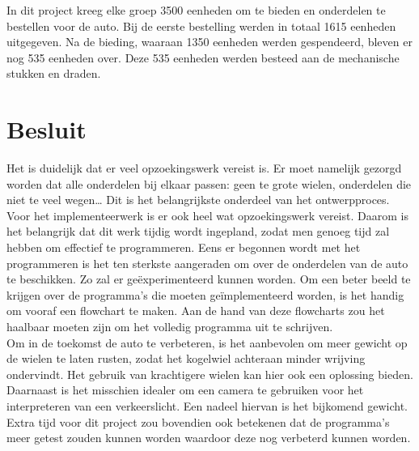\documentclass[a4paper,twoside,kulak]{kulakreport} %
\begin{document}
In dit project kreeg elke groep 3500 eenheden om te bieden en onderdelen te bestellen voor de auto. Bij de eerste bestelling werden in totaal 1615 eenheden uitgegeven. Na de bieding, waaraan 1350 eenheden werden gespendeerd, bleven er nog 535 eenheden over. Deze 535 eenheden werden besteed aan de mechanische stukken en draden. 



\section{Besluit}
Het is duidelijk dat er veel opzoekingswerk vereist is. Er moet namelijk gezorgd worden dat alle onderdelen bij elkaar passen: geen te grote wielen, onderdelen die niet te veel wegen… Dit is het belangrijkste onderdeel van het ontwerpproces.\\
Voor het implementeerwerk is er ook heel wat opzoekingswerk vereist. Daarom is het belangrijk dat dit werk tijdig wordt ingepland, zodat men genoeg tijd zal hebben om effectief te programmeren. Eens er begonnen wordt met het programmeren is het ten sterkste aangeraden om over de onderdelen van de auto te beschikken. Zo zal er geëxperimenteerd kunnen worden. Om een beter beeld te krijgen over de programma’s die moeten geïmplementeerd worden, is het handig om vooraf een flowchart te maken. Aan de hand van deze flowcharts zou het haalbaar moeten zijn om het volledig programma uit te schrijven.\\
Om in de toekomst de auto te verbeteren, is het aanbevolen om meer gewicht op de wielen te laten rusten, zodat het kogelwiel achteraan minder wrijving ondervindt. Het gebruik van krachtigere wielen kan hier ook een oplossing bieden. Daarnaast is het misschien idealer om een camera te gebruiken voor het interpreteren van een verkeerslicht. Een nadeel hiervan is het bijkomend gewicht. 
Extra tijd voor dit project zou bovendien ook betekenen dat de programma’s meer getest zouden kunnen worden waardoor deze nog verbeterd kunnen worden.




\newpage

\appendix
\label{financieel rapport}
\label{TechTekChassis}
\label{TechTekWiel}
\label{TechTekMotor}
\label{TechTekMicrocontroller}
\label{TechTekReflectiesensor}
\label{TechTekAfstandssensor}
\label{TechTekKleurensensor}







\end{document}
